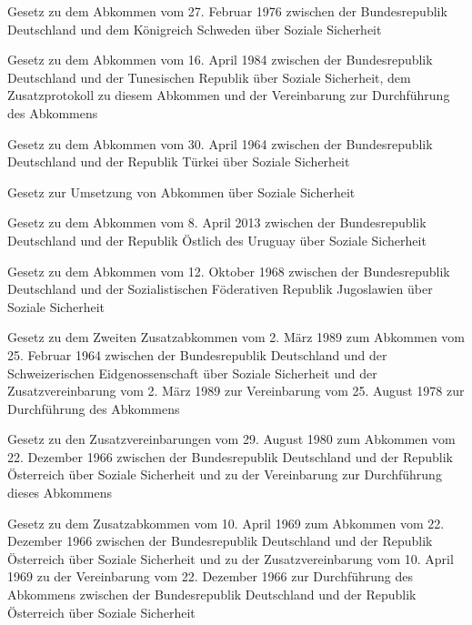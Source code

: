 \item[{SozSichAbkSWEG}] Gesetz zu dem Abkommen vom 27. Februar 1976 zwischen der Bundesrepublik Deutschland und dem Königreich Schweden über Soziale Sicherheit

\item[{SozSichAbkTUNG}] Gesetz zu dem Abkommen vom 16. April 1984 zwischen der Bundesrepublik Deutschland und der Tunesischen Republik über Soziale Sicherheit, dem Zusatzprotokoll zu diesem Abkommen und der Vereinbarung zur Durchführung des Abkommens

\item[{SozSichAbkTURG}] Gesetz zu dem Abkommen vom 30. April 1964 zwischen der Bundesrepublik Deutschland und der Republik Türkei über Soziale Sicherheit

\item[{SozSichAbkUmsG}] Gesetz zur Umsetzung von Abkommen über Soziale Sicherheit

\item[{SozSichAbkURYG}] Gesetz zu dem Abkommen vom 8. April 2013 zwischen der Bundesrepublik Deutschland und der Republik Östlich des Uruguay über Soziale Sicherheit

\item[{SozSichAbkYUGG}] Gesetz zu dem Abkommen vom 12. Oktober 1968 zwischen der Bundesrepublik Deutschland und der Sozialistischen Föderativen Republik Jugoslawien über Soziale Sicherheit

\item[{SozSichAbkZAbk2-ZVbgCHEG}] Gesetz zu dem Zweiten Zusatzabkommen vom 2. März 1989 zum Abkommen vom 25. Februar 1964 zwischen der Bundesrepublik Deutschland und der Schweizerischen Eidgenossenschaft über Soziale Sicherheit und der Zusatzvereinbarung vom 2. März 1989 zur Vereinbarung vom 25. August 1978 zur Durchführung des Abkommens

\item[{SozSichAbkZAbk3-DVbgZVbgAUT3G}] Gesetz zu den Zusatzvereinbarungen vom 29. August 1980 zum Abkommen vom 22. Dezember 1966 zwischen der Bundesrepublik Deutschland und der Republik Österreich über Soziale Sicherheit und zu der Vereinbarung zur Durchführung dieses Abkommens

\item[{SozSichAbkZAbkAUTG}] Gesetz zu dem Zusatzabkommen vom 10. April 1969 zum Abkommen vom 22. Dezember 1966 zwischen der Bundesrepublik Deutschland und der Republik Österreich über Soziale Sicherheit und zu der Zusatzvereinbarung vom 10. April 1969 zu der Vereinbarung vom 22. Dezember 1966 zur Durchführung des Abkommens zwischen der Bundesrepublik Deutschland und der Republik Österreich über Soziale Sicherheit

